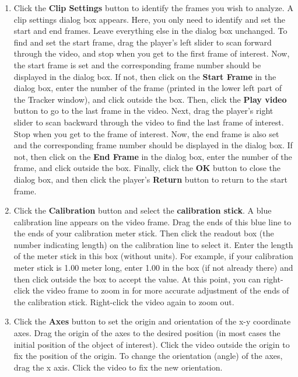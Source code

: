 \begin{enumerate}
\item Click the {\bf Clip Settings} button to identify the frames you wish to analyze. 
A clip settings dialog box appears. 
Here, you only need to identify and set the start and end frames. 
Leave everything else in the dialog box unchanged. 
To find and set the start frame, drag the player's left slider to scan forward through the video, and 
stop when you get to the first frame of interest. 
Now, the start frame is set and the corresponding frame number should be displayed in the dialog box. 
If not, then click on the {\bf Start Frame} in the dialog box, enter the number of the frame 
(printed in the lower left part of the Tracker window), and click outside the box.
Then, click the {\bf Play video} button to go to the last frame in the video. 
Next, drag the player's right slider to scan backward through the video to find the last frame of interest. 
Stop when you get to the frame of interest. Now, the end frame is also set and the corresponding frame number should be displayed in the dialog box. 
If not, then click on the {\bf End Frame} in the dialog box, enter the number of the frame, and click outside the box.
Finally, click the {\bf OK} button to close the dialog box, and then click the player's {\bf Return} button to return to the start frame.

\item Click the {\bf Calibration} button and select the {\bf calibration stick}. 
A blue calibration line appears on the video frame. 
Drag the ends of this blue line to the ends of your calibration meter stick. 
Then click the readout box (the number indicating length) on the calibration 
line to select it. 
Enter the length of the meter stick in this box (without units). 
For example, if your calibration meter stick is 1.00 meter long, enter 
1.00 in the box (if not already there) 
and then click outside the box to accept the value. 
At this point, you can right-click the video frame to zoom in for more accurate adjustment of the ends of the calibration stick. 
Right-click the video again to zoom out.

\item Click the {\bf Axes} button to set the origin and orientation of the x-y coordinate axes. 
Drag the origin of the axes to the desired position (in most cases the initial position of the object of interest). 
Click the video outside the origin to fix the position of the origin. 
To change the orientation (angle) of the axes, drag the x axis. 
Click the video to fix the new orientation.


\end{enumerate}
